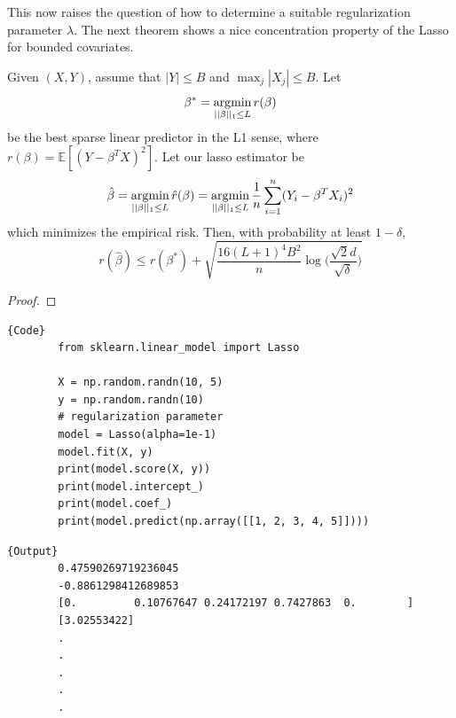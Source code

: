     This now raises the question of how to determine a suitable regularization parameter $\lambda$. The next theorem shows a nice concentration property of the Lasso for bounded covariates. 

    \begin{theorem}
      Given $(X, Y)$, assume that $|Y| \leq B$ and $\max_j |X_j| \leq B$. Let 
      \begin{equation}
        \beta^\ast = \argmin_{||\beta||_1 \leq L} r(\beta)
      \end{equation}
      be the best sparse linear predictor in the L1 sense, where $r(\beta) = \mathbb{E}[ (Y - \beta^T X)^2]$. Let our lasso estimator be 
      \begin{equation}
        \hat{\beta} = \argmin_{||\beta||_1 \leq L} \hat{r}(\beta) = \argmin_{||\beta||_1 \leq L} \frac{1}{n} \sum_{i=1}^n (Y_i - \beta^T X_i)^2
      \end{equation}
      which minimizes the empirical risk. Then, with probability at least $1 - \delta$, 
      \begin{equation}
        r(\hat{\beta}) \leq r(\beta^\ast) + \sqrt{\frac{16(L+1)^4 B^2}{n} \log \bigg( \frac{\sqrt{2} d}{\sqrt{\delta}} \bigg)} 
      \end{equation}
    \end{theorem}
    \begin{proof}
      
    \end{proof}

    \begin{code}
      \noindent\begin{minipage}{.6\textwidth}
      \begin{lstlisting}[]{Code}
        from sklearn.linear_model import Lasso

        X = np.random.randn(10, 5) 
        y = np.random.randn(10)
        # regularization parameter
        model = Lasso(alpha=1e-1)  
        model.fit(X, y) 
        print(model.score(X, y))  
        print(model.intercept_)
        print(model.coef_) 
        print(model.predict(np.array([[1, 2, 3, 4, 5]]))) 
      \end{lstlisting}
      \end{minipage}
      \hfill
      \begin{minipage}{.39\textwidth}
      \begin{lstlisting}[]{Output}
        0.47590269719236045
        -0.8861298412689853
        [0.         0.10767647 0.24172197 0.7427863  0.        ]
        [3.02553422]
        .
        .
        .
        .
        .
      \end{lstlisting}
      \end{minipage}
    \end{code}

